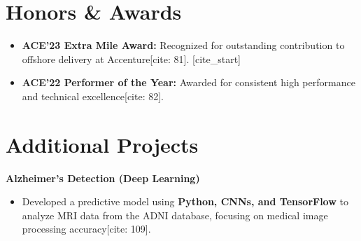 \documentclass[a4paper,10pt]{article}
\begin{document}
\section{Honors \& Awards}
\begin{itemize}[leftmargin=*, noitemsep]
    [cite_start]\item \textbf{ACE'23 Extra Mile Award:} Recognized for outstanding contribution to offshore delivery at Accenture[cite: 81].
    [cite_start]\item \textbf{ACE'22 Performer of the Year:} Awarded for consistent high performance and technical excellence[cite: 82].
\end{itemize}

\section{Additional Projects}
\textbf{Alzheimer’s Detection (Deep Learning)}
\begin{itemize}[leftmargin=*, noitemsep]
    [cite_start]\item Developed a predictive model using \textbf{Python, CNNs, and TensorFlow} to analyze MRI data from the ADNI database, focusing on medical image processing accuracy[cite: 109].
\end{itemize}
\end{document}
